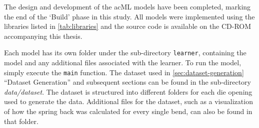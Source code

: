 The design and development of the ac{ML} models have been completed, marking the end of the `Build' phase
in this study.
All models were implemented using the libraries listed in \cref{tab:libraries} and the source
code is available on the CD-ROM accompanying this thesis.

Each model has its own folder under the sub-directory \texttt{learner}, containing the model and any additional files
associated with the learner.
To run the model, simply execute the \texttt{main} function.
The dataset used in \cref{sec:dataset-generation} ``Dataset Generation'' and subsequent sections can be found in
the sub-directory \textit{data/dataset}.
The dataset is structured into different folders for each die opening used
to generate the data.
Additional files for the dataset, such as a visualization of how the spring back was calculated
for every single bend, can also be found in that folder.